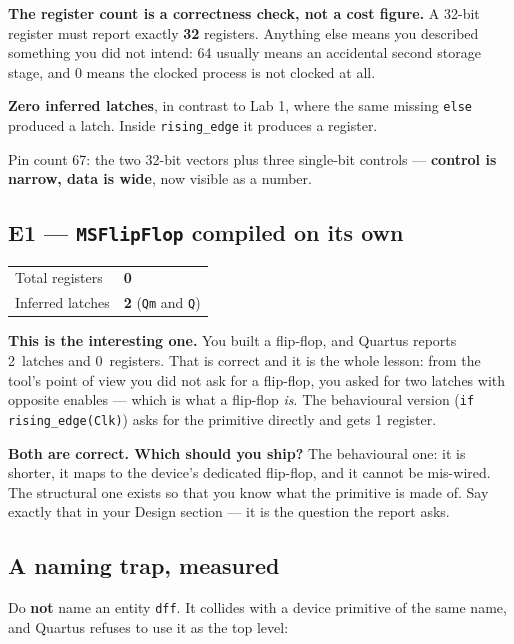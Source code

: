 \documentclass[11pt]{article}
\newcommand{\code}[1]{\texttt{#1}}
\begin{document}
\textbf{The register count is a correctness check, not a cost figure.} A 32-bit
register must report exactly \textbf{32} registers. Anything else means you
described something you did not intend: 64 usually means an accidental second
storage stage, and 0 means the clocked process is not clocked at all.

\textbf{Zero inferred latches}, in contrast to Lab 1, where the same missing
\code{else} produced a latch. Inside \code{rising\_edge} it produces a register.

Pin count 67: the two 32-bit vectors plus three single-bit controls ---
\textbf{control is narrow, data is wide}, now visible as a number.

\subsection*{E1 --- \code{MSFlipFlop} compiled on its own}

\begin{center}
\begin{tabular}{ll}
\toprule
Total registers & \textbf{0} \\
Inferred latches & \textbf{2} \quad (\code{Qm} and \code{Q}) \\
\bottomrule
\end{tabular}
\end{center}

\textbf{This is the interesting one.} You built a flip-flop, and Quartus reports
2~latches and 0~registers. That is correct and it is the whole lesson:
from the tool's point of view you did not ask for a flip-flop, you asked for two
latches with opposite enables --- which is what a flip-flop \emph{is}. The
behavioural version (\code{if rising\_edge(Clk)}) asks for the primitive directly
and gets 1 register.

\textbf{Both are correct. Which should you ship?} The behavioural one: it is
shorter, it maps to the device's dedicated flip-flop, and it cannot be
mis-wired. The structural one exists so that you know what the primitive is made
of. Say exactly that in your Design section --- it is the question the report asks.

\subsection*{A naming trap, measured}

Do \textbf{not} name an entity \code{dff}. It collides with a device primitive of
the same name, and Quartus refuses to use it as the top level:
\end{document}
